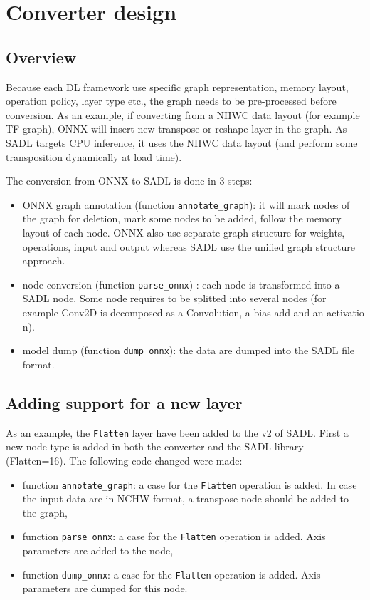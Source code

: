 \documentclass[10pt,a4paper]{article}
\begin{document}
\section{Converter design}
\subsection{Overview}
Because each DL framework use specific graph representation, memory layout, operation policy, layer type etc., the graph needs to be pre-processed before conversion. As an example, if converting from a NHWC data layout (for example TF graph), ONNX will insert new transpose or reshape layer in the graph.
As SADL targets CPU inference, it uses the NHWC data layout (and perform some transposition dynamically at load time).

The conversion from ONNX to SADL is done in 3 steps:
\begin{itemize}
\item ONNX graph annotation (function \texttt{annotate\_graph}): it will mark nodes of the graph for deletion, mark some nodes to be added, follow the memory layout of each node. ONNX also use separate graph structure for weights, operations, input and output whereas SADL use the unified graph structure approach.
\item node conversion (function \texttt{parse\_onnx}) : each node is transformed into a SADL node. Some node requires to be splitted into several nodes (for example Conv2D is decomposed as a Convolution, a bias add and an activatio n).
\item model dump (function \texttt{dump\_onnx}): the data are dumped into the SADL file format.
\end{itemize}


\subsection{Adding support for a new layer}
As an example, the \texttt{Flatten} layer have been added to the v2 of SADL. First a new node type is added in both the converter and the SADL library (\textrm{Flatten=16}).
The following code changed were made:
\begin{itemize}
\item function \texttt{annotate\_graph}: a case for the \texttt{Flatten} operation is added. In case the input data are in NCHW format, a transpose node should be added to the graph,
\item function \texttt{parse\_onnx}: a case for the \texttt{Flatten} operation is added. Axis parameters are added to the node,
\item function \texttt{dump\_onnx}: a case for the \texttt{Flatten} operation is added. Axis parameters are dumped for this node.
\end{itemize}
\end{document}
